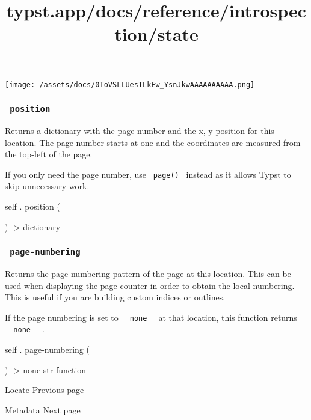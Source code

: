 \texttt{[image: /assets/docs/0ToVSLLUesTLkEw\_YsnJkwAAAAAAAAAA.png]}

\subsubsection{\texorpdfstring{\texttt{\ position\ }}{ position }}\label{definitions-position}

Returns a dictionary with the page number and the x, y position for this
location. The page number starts at one and the coordinates are measured
from the top-left of the page.

If you only need the page number, use \texttt{\ page()\ } instead as it
allows Typst to skip unnecessary work.

self { . } { position } (

) -\textgreater{}
\href{/docs/reference/foundations/dictionary/}{dictionary}

\subsubsection{\texorpdfstring{\texttt{\ page-numbering\ }}{ page-numbering }}\label{definitions-page-numbering}

Returns the page numbering pattern of the page at this location. This
can be used when displaying the page counter in order to obtain the
local numbering. This is useful if you are building custom indices or
outlines.

If the page numbering is set to
\texttt{\ }{\texttt{\ none\ }}\texttt{\ } at that location, this
function returns \texttt{\ }{\texttt{\ none\ }}\texttt{\ } .

self { . } { page-numbering } (

) -\textgreater{} \href{/docs/reference/foundations/none/}{none}
\href{/docs/reference/foundations/str/}{str}
\href{/docs/reference/foundations/function/}{function}

\href{/docs/reference/introspection/locate/}{\pandocbounded{}}

{ Locate } { Previous page }

\href{/docs/reference/introspection/metadata/}{\pandocbounded{}}

{ Metadata } { Next page }


\title{typst.app/docs/reference/introspection/state}


